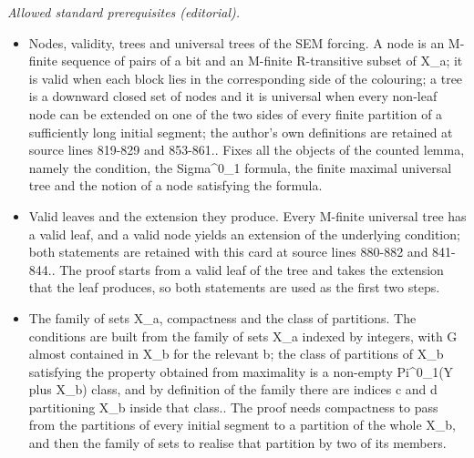 \documentclass{article}
\numberwithin{theorem}{section}
\begin{document}
\noindent\textit{Allowed standard prerequisites (editorial).}\begin{itemize}
\item Nodes, validity, trees and universal trees of the SEM forcing. A node is an M-finite sequence of pairs of a bit and an M-finite R-transitive subset of X\_a; it is valid when each block lies in the corresponding side of the colouring; a tree is a downward closed set of nodes and it is universal when every non-leaf node can be extended on one of the two sides of every finite partition of a sufficiently long initial segment; the author's own definitions are retained at source lines 819-829 and 853-861.. Fixes all the objects of the counted lemma, namely the condition, the Sigma\textasciicircum{}0\_1 formula, the finite maximal universal tree and the notion of a node satisfying the formula.
\item Valid leaves and the extension they produce. Every M-finite universal tree has a valid leaf, and a valid node yields an extension of the underlying condition; both statements are retained with this card at source lines 880-882 and 841-844.. The proof starts from a valid leaf of the tree and takes the extension that the leaf produces, so both statements are used as the first two steps.
\item The family of sets X\_a, compactness and the class of partitions. The conditions are built from the family of sets X\_a indexed by integers, with G almost contained in X\_b for the relevant b; the class of partitions of X\_b satisfying the property obtained from maximality is a non-empty Pi\textasciicircum{}0\_1(Y plus X\_b) class, and by definition of the family there are indices c and d partitioning X\_b inside that class.. The proof needs compactness to pass from the partitions of every initial segment to a partition of the whole X\_b, and then the family of sets to realise that partition by two of its members.
\end{itemize}\medskip
\end{document}
